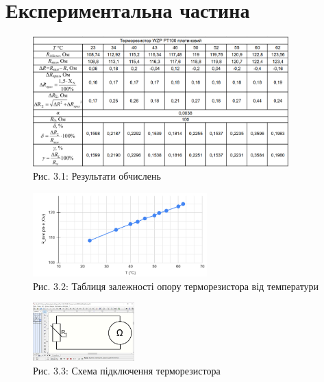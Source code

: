 \documentclass[a4paper]{article}
\begin{document}
\newpage 



\section*{Експериментальна частина}

\begin{figure}[h]
    \centering
\includegraphics[width=0.88\textwidth]{imgs/LW3.1.png}
    \caption*{Рис. 3.1: Результати обчислень}
\end{figure} 

\begin{figure}[h]
    \centering
\includegraphics[width=0.6\textwidth]{imgs/LW3.3.png}
    \caption*{Рис. 3.2: Таблиця залежності опору терморезистора від температури}
\end{figure} 

\begin{figure}[h]
    \centering
\includegraphics[width=0.35\textwidth]{imgs/LW3.2.png}
    \caption*{Рис. 3.3: Схема підключення терморезистора}
\end{figure} 
\end{document}
